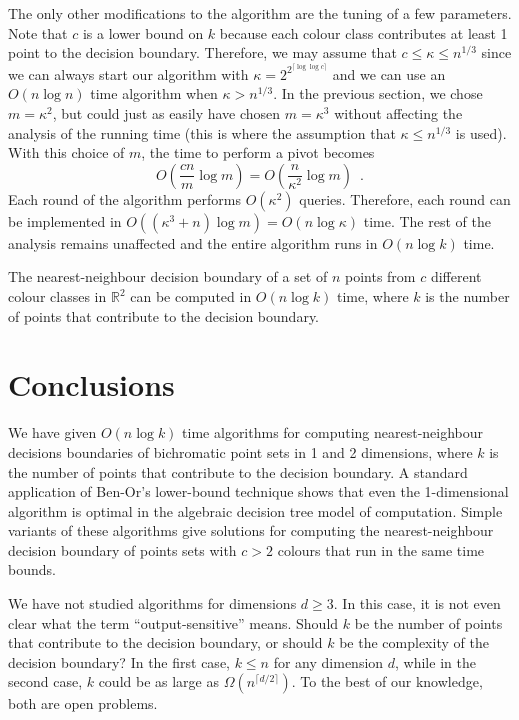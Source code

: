 \documentclass[lotsofwhite,charterfonts]{patmorin}
\newcommand{\ceil}[1]{\lceil #1 \rceil}
\begin{document}
The only other modifications to the algorithm are the tuning of a few
parameters. Note that $c$ is a lower bound on $k$ because each colour
class contributes at least 1 point to the decision boundary.
Therefore, we may assume that $c\le \kappa\le n^{1/3}$ since we can
always start our algorithm with $\kappa=2^{2^{\ceil{\log\log c}}}$ and
we can use an $O(n\log n)$ time algorithm when $\kappa>n^{1/3}$.  In
the previous section, we chose $m=\kappa^2$, but could just as easily
have chosen $m=\kappa^3$ without affecting the analysis of the running
time (this is where the assumption that $\kappa\le n^{1/3}$ is used).
With this choice of $m$, the time to perform a pivot becomes \[
O\left(\frac{cn}{m}\log m\right) = O\left(\frac{n}{\kappa^2}\log
m\right) \enspace .  \] Each round of the algorithm performs
$O(\kappa^2)$ queries. Therefore, each round can be implemented in
$O((\kappa^3+n)\log m)=O(n\log\kappa)$ time.  The rest of the analysis
remains unaffected and the entire algorithm runs in $O(n\log k)$ time.

\begin{thm}
The nearest-neighbour decision boundary of a set of $n$ points from
$c$ different colour classes in $\mathbb{R}^2$ can be computed in
$O(n\log k)$ time, where $k$ is the number of points that contribute
to the decision boundary.
\end{thm}

\section{Conclusions}

We have given $O(n\log k)$ time algorithms for computing
nearest-neighbour decisions boundaries of bichromatic point sets in 1
and 2 dimensions, where $k$ is the number of points that contribute to
the decision boundary.  A standard application of Ben-Or's lower-bound
technique \cite{bo83} shows that even the 1-dimensional algorithm is
optimal in the algebraic decision tree model of computation. Simple
variants of these algorithms give solutions for computing the
nearest-neighbour decision boundary of points sets with $c>2$ colours
that run in the same time bounds.

We have not studied algorithms for dimensions $d\ge 3$. In this case,
it is not even clear what the term ``output-sensitive'' means.  Should
$k$ be the number of points that contribute to the decision boundary,
or should $k$ be the complexity of the decision boundary?  In the
first case, $k\le n$ for any dimension $d$, while in the second case,
$k$ could be as large as $\Omega(n^{\lceil d/2\rceil})$.  To the best
of our knowledge, both are open problems.
\end{document}

